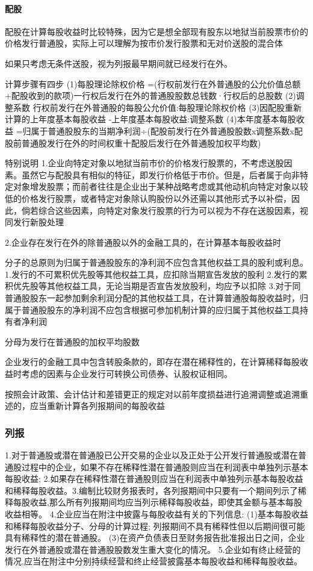 \documentclass[UTF8,12pt]{ctexart}
\numberwithin{equation}{section} %
\numberwithin{figure}{section}
\numberwithin{table}{section}
\begin{document}
	\paragraph{配股}
	配股在计算每股收益时比较特殊，因为它是想全部现有股东以地狱当前股票市价的价格发行普通股，实际上可以理解为按市价发行股票和无对价送股的混合体
	
	如果只考虑无条件送股，视为列报最早期间就已经发行在外。
	
	计算步骤有四步
	(1)每股理论除权价格
	=(行权前发行在外普通股的公允价值总额+配股收到的款项)一行权后发行在外的普通股股数总钱数·行权后的总股数
	(2)调整系数
	行权前发行在外普通股的每股公允价值:每股理论除权价格
	(3)因配股重新计算的上年度基本每股收益
	-上年度基本每股收益:调整系数
	(4)本年度基本每股收益
	=归属于普通股股东的当期净利润÷(配股前发行在外普通股股数x调整系数x配股前普通股发行在外的时间权重十配股后发行在外普通股加权平均数)
	
	特别说明
	1.企业向特定对象以地狱当前市价的价格发行股票的，不考虑送股因素。虽然它与配股具有相似的特征，即发行价格低于市价。但是，后者属于向非特定对象增发股票；而前者往往是企业出于某种战略考虑或其他动机向特定对象以较低的价格发行股票，或者特定对象除认购股份以外还需以其他形式予以补偿，因此，倘若综合这些因素，向特定对象发行股票的行为可以视为不存在送股因素，视同发行新股处理
	
	2.企业存在发行在外的除普通股以外的金融工具的，在计算基本每股收益时
	
	分子的总原则为归属于普通股股东的净利润不应包含其他权益工具的股利或利息。
	1.发行的不可累积优先股等其他权益工具，应扣除当期宣告发放的股利
	2.发行的累积优先股等其他权益工具，无论当期是否宣告发放股利，均应予以扣除
	3.对于同普通股股东一起参加剩余利润分配的其他权益工具，在计算普通股每股收益时，归属于普通股股东的净利润不应包含根据可参加机制计算的应归属于其他权益工具持有者净利润
	
	分母为发行在普通股的加权平均股数
	
	企业发行的金融工具中包含转股条款的，即存在潜在稀释性的，在计算稀释每股收益时考虑的因素与企业发行可转换公司债券、认股权证相同。
	
	按照会计政策、会计估计和差错更正的规定对以前年度损益进行追溯调整或追溯重述的，应当重新计算各列报期间的每股收益
	\subsubsection{列报}
	1.对于普通股或潜在普通股已公开交易的企业以及正处于公开发行普通股或潜在普通股过程中的企业，如果不存在稀释性潜在普通股则应当在利润表中单独列示基本每股收益;
	2.如果存在稀释性潜在普通股则应当在利润表中单独列示基本每股收益和稀释每股收益。3.编制比较财务报表时，各列报期间中只要有一个期间列示了稀释每股收益,那么所有列报期间均应当列示稀释每股收益，即使其金额与基本每股收益相等。
	4.企业应当在附注中披露与每股收益有关的下列信息:
	(1)基本每股收益和稀释每股收益分子、分母的计算过程;
	列报期间不具有稀释性但以后期间很可能具有稀释性的潜在普通股。
	(3)在资产负债表日至财务报告批准报出日之间，企业发行在外普通股或潜在普通股股数发生重大变化的情况。
	5.企业如有终止经营的情况,应当在附注中分别持续经营和终止经营披露基本每股收益和稀释每股收益。
	
\end{document}
